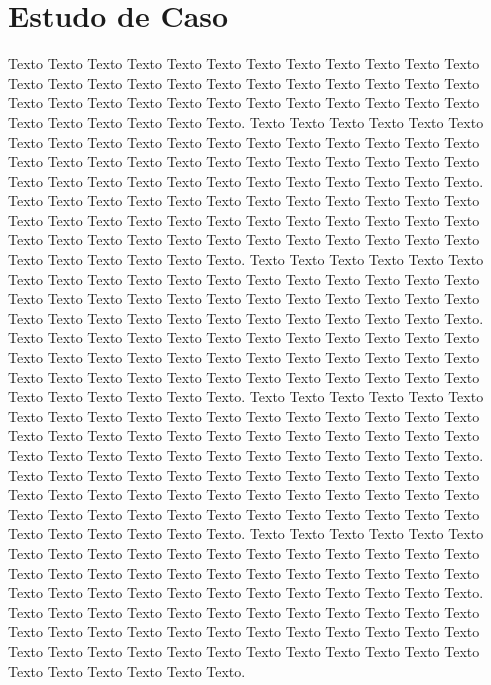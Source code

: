 \chapter{Estudo de Caso}
\paragrafo{}
Texto Texto Texto Texto Texto Texto Texto Texto Texto Texto Texto Texto Texto Texto Texto Texto Texto Texto Texto Texto Texto Texto Texto Texto Texto Texto Texto Texto Texto Texto Texto Texto Texto Texto Texto Texto Texto Texto Texto Texto Texto Texto.
\paragrafo{}
Texto Texto Texto Texto Texto Texto Texto Texto Texto Texto Texto Texto Texto Texto Texto Texto Texto Texto Texto Texto Texto Texto Texto Texto Texto Texto Texto Texto Texto Texto Texto Texto Texto Texto Texto Texto Texto Texto Texto Texto Texto Texto.
\paragrafo{}
Texto Texto Texto Texto Texto Texto Texto Texto Texto Texto Texto Texto Texto Texto Texto Texto Texto Texto Texto Texto Texto Texto Texto Texto Texto Texto Texto Texto Texto Texto Texto Texto Texto Texto Texto Texto Texto Texto Texto Texto Texto Texto.
\paragrafo{}
Texto Texto Texto Texto Texto Texto Texto Texto Texto Texto Texto Texto Texto Texto Texto Texto Texto Texto Texto Texto Texto Texto Texto Texto Texto Texto Texto Texto Texto Texto Texto Texto Texto Texto Texto Texto Texto Texto Texto Texto Texto Texto.
\paragrafo{}
Texto Texto Texto Texto Texto Texto Texto Texto Texto Texto Texto Texto Texto Texto Texto Texto Texto Texto Texto Texto Texto Texto Texto Texto Texto Texto Texto Texto Texto Texto Texto Texto Texto Texto Texto Texto Texto Texto Texto Texto Texto Texto.
\paragrafo{}
Texto Texto Texto Texto Texto Texto Texto Texto Texto Texto Texto Texto Texto Texto Texto Texto Texto Texto Texto Texto Texto Texto Texto Texto Texto Texto Texto Texto Texto Texto Texto Texto Texto Texto Texto Texto Texto Texto Texto Texto Texto Texto.
\paragrafo{}
Texto Texto Texto Texto Texto Texto Texto Texto Texto Texto Texto Texto Texto Texto Texto Texto Texto Texto Texto Texto Texto Texto Texto Texto Texto Texto Texto Texto Texto Texto Texto Texto Texto Texto Texto Texto Texto Texto Texto Texto Texto Texto.
\paragrafo{}
Texto Texto Texto Texto Texto Texto Texto Texto Texto Texto Texto Texto Texto Texto Texto Texto Texto Texto Texto Texto Texto Texto Texto Texto Texto Texto Texto Texto Texto Texto Texto Texto Texto Texto Texto Texto Texto Texto Texto Texto Texto Texto.
\paragrafo{}
Texto Texto Texto Texto Texto Texto Texto Texto Texto Texto Texto Texto Texto Texto Texto Texto Texto Texto Texto Texto Texto Texto Texto Texto Texto Texto Texto Texto Texto Texto Texto Texto Texto Texto Texto Texto Texto Texto Texto Texto Texto Texto.
